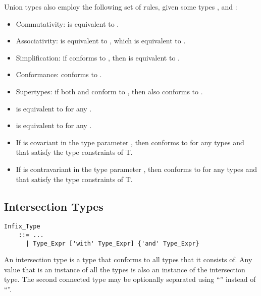 Union types also employ the following set of rules, given some types ,  and :
\begin{itemize}
  \item Commutativity:  is equivalent to . 
  \item Associativity:  is equivalent to , which is equivalent to . 
  \item Simplification: if  conforms to , then  is equivalent to . 
  \item Conformance:  conforms to . 
  \item Supertypes: if both  and  conform to , then  also conforms to . 
  
  \item {} is equivalent to  for any . 
  \item {} is equivalent to  for any . 
  
  \item If  is covariant in the type parameter , then  conforms to  for any types  and  that satisfy the type constraints of T. 
  \item If  is contravariant in the type parameter , then  conforms to  for any types  and  that satisfy the type constraints of T. 
\end{itemize}





\subsection{Intersection Types}
\label{sec:intersection-types}

\grammar\begin{lstlisting}
Infix_Type 
    ::= ...
      | Type_Expr ['with' Type_Expr] {'and' Type_Expr}
\end{lstlisting}

An intersection type is a type that conforms to all types that it consists of. Any value that is an instance of all the types is also an instance of the intersection type. The second connected type may be optionally separated using ``'' instead of ``''.

